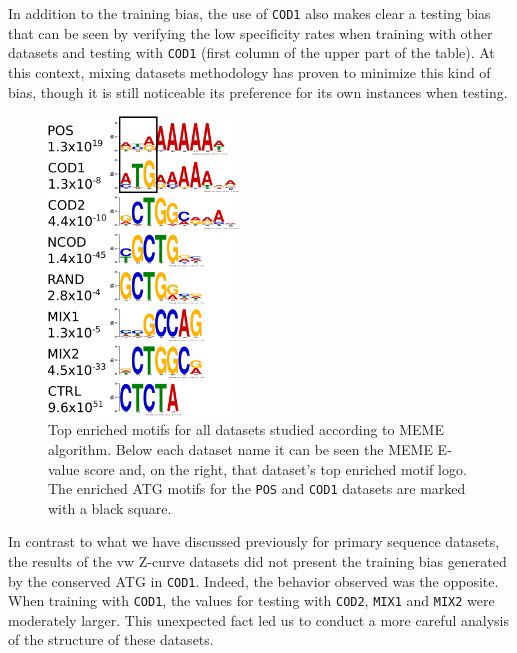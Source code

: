 \documentclass[conference,letterpaper]{IEEEtran}
\begin{document}
In addition to the training bias, the use of {\tt COD1} also makes clear a testing bias that can be seen by verifying the low specificity rates when training with other datasets and testing with {\tt COD1} (first column of the upper part of the table). At this context, mixing datasets methodology has proven to minimize this kind of bias, though it is still noticeable its preference for its own instances when testing.

\begin{figure}
\vspace{0.0cm}
    \centering
    \includegraphics[width=0.45\textwidth]{Figs/MEME.pdf}
    \caption{Top enriched motifs for all datasets studied according to MEME algorithm. Below each dataset name it can be seen the MEME E-value score and, on the right, that dataset's top enriched motif logo. The enriched ATG motifs for the {\tt POS} and {\tt COD1} datasets are marked with a black square.}
    \label{fig:meme}
\end{figure}

In contrast to what we have discussed previously for primary sequence datasets, the results of the vw Z-curve datasets did not present the training bias generated by the conserved ATG in {\tt COD1}. Indeed, the behavior observed was the opposite. When training with {\tt COD1}, the values for testing with {\tt COD2}, {\tt MIX1} and {\tt MIX2} were moderately larger. This unexpected fact led us to conduct a more careful analysis of the structure of these datasets.
\end{document}
